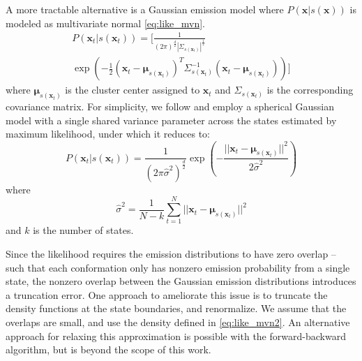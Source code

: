 \documentclass[journal=jpcbfk, layout=traditional, manuscript=article]{achemso}
\begin{document}
A more tractable alternative is a Gaussian emission model where $P(\mathbf{x} | s(\mathbf{x}))$ is modeled as multivariate normal \cref{eq:like_mvn}.
\begin{equation}
\label{eq:like_mvn}
\begin{split}
P(\mathbf{x}_t | s(\mathbf{x}_t)) = \Bigg[ \frac{1}{(2 \pi)^\frac{d}{2} |\Sigma_{s(\mathbf{x}_t)}|^\frac{1}{2}} \\
   \exp\left(-\frac{1}{2} (\mathbf{x}_t - \bm{\mu}_{s(\mathbf{x}_t)})^T \Sigma_{s(\mathbf{x}_t)}^{-1} (\mathbf{x}_t - \bm{\mu}_{s(\mathbf{x}_t)})\right)\Bigg] 
\end{split}
\end{equation} where $\bm{\mu}_{s(\mathbf{x}_t)}$ is the cluster center assigned to $\mathbf{x}_t$ and $\Sigma_{s(\mathbf{x}_t)}$ is the corresponding covariance matrix. For simplicity, we follow \citet{Pelleg2000Xmeans} and employ a spherical Gaussian model with a single shared variance parameter across the states estimated by maximum likelihood, under which it reduces to:
\begin{equation}
\label{eq:like_mvn2}
 P(\mathbf{x}_t | s(\mathbf{x}_t)) = \frac{1}{\left(2 \pi \hat{\sigma}^2\right)^{\frac{d}{2}}} \exp\left(-\frac{||\mathbf{x}_t - \bm{\mu}_{s(\mathbf{x}_t)}||^2}{2 \hat{\sigma}^2} \right)
\end{equation} where
\begin{equation}
\label{eq:mle_sigma}
\hat{\sigma}^2 = \frac{1}{N - k} \sum_{t=1}^N || \mathbf{x}_t - \bm{\mu}_{s(\mathbf{x}_t)} ||^2
\end{equation} and $k$ is the number of states.

Since the likelihood requires the emission distributions to have zero overlap -- such that each conformation only has nonzero emission probability from a single state, the nonzero overlap between the Gaussian emission distributions introduces a truncation error. One approach to ameliorate this issue is to truncate the density functions at the state boundaries, and renormalize. We assume that the overlaps are small, and use the density defined in \cref{eq:like_mvn2}. An alternative approach for relaxing this approximation is possible with the forward-backward algorithm,\cite{Rabiner1989Tutorial} but is beyond the scope of this work.
\end{document}

